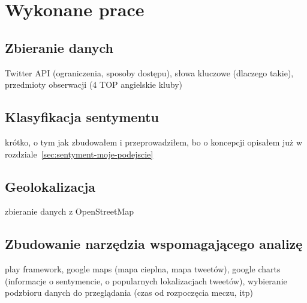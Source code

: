 \chapter{Wykonane prace}
\section{Zbieranie danych}
Twitter API (ograniczenia, sposoby dostępu), słowa kluczowe (dlaczego takie),
przedmioty obserwacji (4 TOP angielskie kluby)
\section{Klasyfikacja sentymentu}
krótko, o tym jak zbudowałem i przeprowadziłem, bo o koncepcji opisałem już w
rozdziale~\ref{sec:sentyment-moje-podejscie}
\section{Geolokalizacja}
zbieranie danych z OpenStreetMap
\section{Zbudowanie narzędzia wspomagającego analizę}
play framework, google maps (mapa cieplna, mapa tweetów), google charts 
(informacje o sentymencie, o popularnych lokalizacjach tweetów),
wybieranie podzbioru danych do przeglądania (czas od rozpoczęcia meczu, itp)